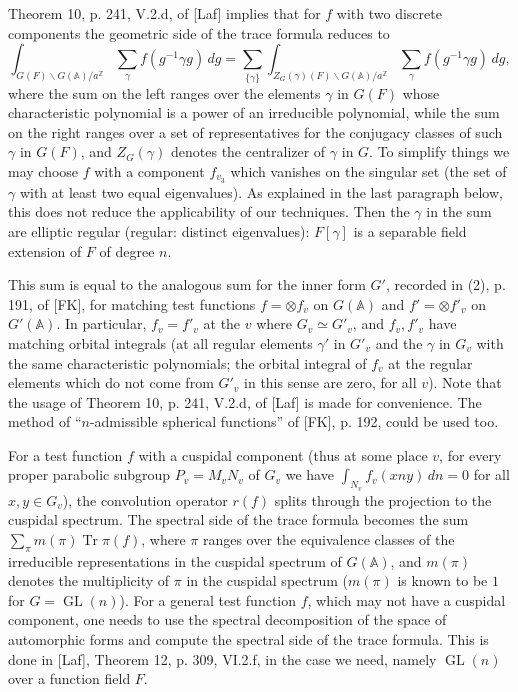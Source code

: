 \documentclass[10pt]{article}
\newcommand{\Z}{\mathbb Z}
\newcommand{\Adele}{\mathbb A}
\newcommand{\GL}{\operatorname{GL}}
\newcommand{\Tr}{\operatorname{Tr}}
\theoremstyle{deligne}
\begin{document}
Theorem 10, p. 241, V.2.d, of [Laf] implies that for $f$ with two discrete components the geometric side of the trace formula reduces to
\[
\int_{G(F)\backslash G(\Adele)/a^{\Z}}\sum_\gamma f(g^{-1}\gamma g)\,dg
=\sum_{\{\gamma\}}\int_{Z_G(\gamma)(F)\backslash G(\Adele)/a^{\Z}}\sum_\gamma f(g^{-1}\gamma g)\,dg,
\]
where the sum on the left ranges over the elements $\gamma$ in $G(F)$ whose characteristic polynomial is a power of an irreducible polynomial, while the sum on the right ranges over a set of representatives for the conjugacy classes of such $\gamma$ in $G(F)$, and $Z_G(\gamma)$ denotes the centralizer of $\gamma$ in $G$. To simplify things we may choose $f$ with a component $f_{v_3}$ which vanishes on the singular set (the set of $\gamma$ with at least two equal eigenvalues). As explained in the last paragraph below, this does not reduce the applicability of our techniques. Then the $\gamma$ in the sum are elliptic regular (regular: distinct eigenvalues): $F[\gamma]$ is a separable field extension of $F$ of degree $n$.

This sum is equal to the analogous sum for the inner form $G'$, recorded in (2), p. 191, of [FK], for matching test functions $f=\otimes f_v$ on $G(\Adele)$ and $f'=\otimes f'_v$ on $G'(\Adele)$. In particular, $f_v=f'_v$ at the $v$ where $G_v\simeq G'_v$, and $f_v,f'_v$ have matching orbital integrals (at all regular elements $\gamma'$ in $G'_v$ and the $\gamma$ in $G_v$ with the same characteristic polynomials; the orbital integral of $f_v$ at the regular elements which do not come from $G'_v$ in this sense are zero, for all $v$). Note that the usage of Theorem 10, p. 241, V.2.d, of [Laf] is made for convenience. The method of ``$n$-admissible spherical functions'' of [FK], p. 192, could be used too.

For a test function $f$ with a cuspidal component (thus at some place $v$, for every proper parabolic subgroup $P_v=M_vN_v$ of $G_v$ we have $\int_{N_v}f_v(xny)\,dn=0$ for all $x,y\in G_v$), the convolution operator $r(f)$ splits through the projection to the cuspidal spectrum. The spectral side of the trace formula becomes the sum $\sum_\pi m(\pi)\Tr\pi(f)$, where $\pi$ ranges over the equivalence classes of the irreducible representations in the cuspidal spectrum of $G(\Adele)$, and $m(\pi)$ denotes the multiplicity of $\pi$ in the cuspidal spectrum ($m(\pi)$ is known to be $1$ for $G=\GL(n)$). For a general test function $f$, which may not have a cuspidal component, one needs to use the spectral decomposition of the space of automorphic forms and compute the spectral side of the trace formula. This is done in [Laf], Theorem 12, p. 309, VI.2.f, in the case we need, namely $\GL(n)$ over a function field $F$.
\end{document}
